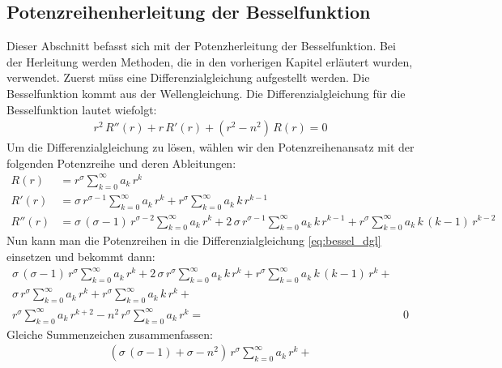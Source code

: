 \begin{refsection}
\section{Potenzreihenherleitung der Besselfunktion}
Dieser Abschnitt befasst sich mit der Potenzherleitung der Besselfunktion. 
Bei der Herleitung werden Methoden, die in den vorherigen Kapitel erl\"autert wurden, 
verwendet. Zuerst m\"uss eine Differenzialgleichung aufgestellt werden.
Die Besselfunktion kommt aus der Wellengleichung.
%
Die Differenzialgleichung für die Besselfunktion lautet wiefolgt:
\begin{align}
	r^2 \, R'' \left( r \right)
	+
	r \, R' \left( r \right)
	+
	\left( r^2 - n^2 \right) \, R \left( r \right)
	=
	0
	\label{eq:bessel_dgl}
\end{align}
Um die Differenzialgleichung zu l\"osen, w\"ahlen wir den Potenzreihenansatz mit der folgenden Potenzreihe und deren Ableitungen:
\begin{align*}
	R \left( r \right)
	&=
	r^{\sigma}
	\sum_{k=0}^{\infty} a_k \, r^k
\\
	R'\left( r \right)
	&=
	\sigma \, r^{\sigma - 1}
	\sum_{k=0}^{\infty} a_k \, r^k
	+
	r^{\sigma}
	\sum_{k=0}^{\infty} a_k \, k \, r^{k - 1}
\\
	R'' \left( r \right)
	&=
	\sigma \, \left( \sigma - 1 \right) \, r^{\sigma - 2}
	\sum_{k=0}^{\infty} a_k \, r^k
	+
	2 \, \sigma \, r^{\sigma - 1}
	\sum_{k=0}^{\infty} a_k \, k \, r^{k - 1}
	+
	r^{\sigma}
	\sum_{k=0}^{\infty} a_k \, k \, \left( k - 1 \right) \, r^{k - 2}	
\end{align*}
Nun kann man die Potenzreihen in die Differenzialgleichung \ref{eq:bessel_dgl} einsetzen und bekommt dann:
\begin{align*}
	\sigma \, \left( \sigma - 1 \right) \, r^{\sigma}
	\sum_{k=0}^{\infty} a_k \, r^k
	+
	2 \, \sigma \, r^{\sigma}
	\sum_{k=0}^{\infty} a_k \, k \, r^k
	+
	r^{\sigma}
	\sum_{k=0}^{\infty} a_k \, k \, \left( k - 1 \right) \, r^k
	+ \\
	\sigma \, r^{\sigma}
	\sum_{k=0}^{\infty} a_k \, r^k
	+
	r^{\sigma}
	\sum_{k=0}^{\infty} a_k \, k \, r^k
	+\\
	r^{\sigma}
	\sum_{k=0}^{\infty} a_k \, r^{k + 2}
	-
	n^2 \, r^{\sigma}
	\sum_{k=0}^{\infty} a_k \, r^k
	= & \, 0
\end{align*}
Gleiche Summenzeichen zusammenfassen:
\begin{align*}
	\left(
	\sigma \, \left( \sigma - 1 \right)
	+
	\sigma
	-
	n^2
	\right)
	\, r^{\sigma}
	\sum_{k=0}^{\infty} a_k \, r^k
	+ \\

\end{align*}
\end{refsection}
